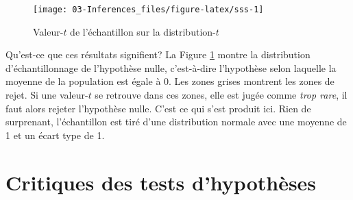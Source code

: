\documentclass[
]{book}
\newenvironment{Shaded}{}{}
\newcommand{\AttributeTok}[1]{#1}
\newcommand{\CommentTok}[1]{\textit{#1}}
\newcommand{\DecValTok}[1]{#1}
\newcommand{\FunctionTok}[1]{#1}
\newcommand{\NormalTok}[1]{#1}
\newcommand{\OtherTok}[1]{#1}
\begin{document}
\begin{Shaded}
\end{Shaded}

\begin{figure}

{\centering \texttt{[image: 03-Inferences\_files/figure-latex/sss-1]} 

}

\caption{Valeur-$t$ de l'échantillon sur la distribution-$t$}\label{fig:sss}
\end{figure}

Qu'est-ce que ces résultats signifient? La Figure \ref{fig:sss} montre la distribution d'échantillonnage de l'hypothèse nulle, c'est-à-dire l'hypothèse selon laquelle la moyenne de la population est égale à 0. Les zones grises montrent les zones de rejet. Si une valeur-\(t\) se retrouve dans ces zones, elle est jugée comme \emph{trop rare}, il faut alors rejeter l'hypothèse nulle. C'est ce qui s'est produit ici. Rien de surprenant, l'échantillon est tiré d'une distribution normale avec une moyenne de 1 et un écart type de 1.

\hypertarget{critiques-des-tests-dhypothuxe8ses}{%
\section{Critiques des tests d'hypothèses}\label{critiques-des-tests-dhypothuxe8ses}}
\end{document}
